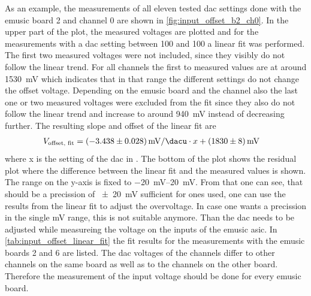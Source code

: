 As an example, the measurements of all eleven tested \ac{dac} settings done with the \ac{emusic} board 2 and channel 0 are shown in \autoref{fig:input_offset_b2_ch0}.
In the upper part of the plot, the measured voltages are plotted and for the measurements with a \ac{dac} setting between \SI{100}{\dacu} and \SI{100}{\dacu} a linear fit was performed.
The first two measured voltages were not included, since they visibly do not follow the linear trend.
For all channels the first to measured values are at around \SI{1530}{\milli\volt} which indicates that in that \si{\dacu} range the different settings do not change the offset voltage.
Depending on the \ac{emusic} board and the channel also the last one or two measured voltages were excluded from the fit since they also do not follow the linear trend and increase to around \SI{940}{\milli\volt} instead of decreasing further.
The resulting slope and offset of the linear fit are
\begin{align}
    V_\text{offset, fit} &= \SI{-3.438(28)}{\milli\volt\per\dacu}\cdot x+\SI{1830(8)}{\milli\volt}
\end{align}
where x is the setting of the \ac{dac} in \si{\dacu}.
The bottom of the plot shows the residual plot where the difference between the linear fit and the measured values is shown.
The range on the y-axis is fixed to \SIrange{-20}{20}{\milli\volt}.
From that one can see, that should be a precission of \SI{+-20}{\milli\volt} sufficient for ones used, one can use the results from the linear fit to adjust the overvoltage.
In case one wants a precission in the single \si{\milli\volt} range, this is not suitable anymore.
Than the \ac{dac} needs to be adjusted while measureing the voltage on the inputs of the \ac{emusic} \ac{asic}.
In \autoref{tab:input_offset_linear_fit} the fit results for the measurements with the \ac{emusic} boards 2 and 6 are listed.
The \ac{dac} voltages of the channels differ to other channels on the same board as well as to the channels on the other board.
Therefore the measurement of the input voltage should be done for every \ac{emusic} board.
